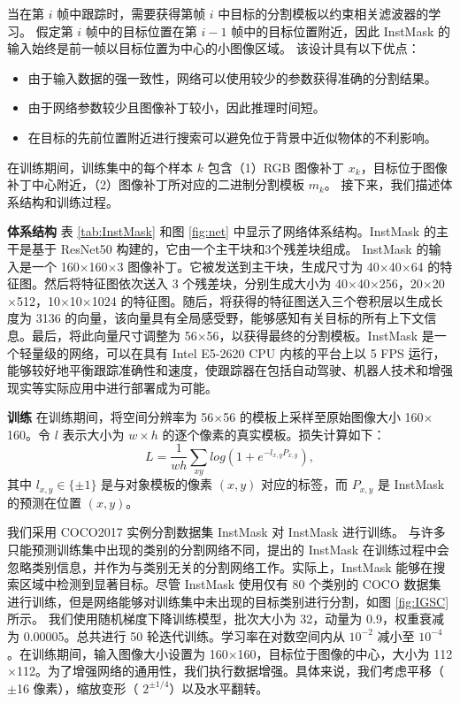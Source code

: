 当在第 $i$ 帧中跟踪时，需要获得第帧 $i$ 中目标的分割模板以约束相关滤波器的学习。
假定第 $i$ 帧中的目标位置在第 $i-1$ 帧中的目标位置附近，因此 InstMask 的输入始终是前一帧以目标位置为中心的小图像区域。
该设计具有以下优点：

\begin{itemize}
\item 由于输入数据的强一致性，网络可以使用较少的参数获得准确的分割结果。
\item 由于网络参数较少且图像补丁较小，因此推理时间短。
\item 在目标的先前位置附近进行搜索可以避免位于背景中近似物体的不利影响。
\end{itemize}

在训练期间，训练集中的每个样本 $k$ 包含（1）RGB 图像补丁 $x_k$，目标位于图像补丁中心附近，（2）图像补丁所对应的二进制分割模板 $m_{k}$。
接下来，我们描述体系结构和训练过程。

\textbf{体系结构} 表 \ref{tab:InstMask} 和图 \ref{fig:net} 中显示了网络体系结构。InstMask 的主干是基于 ResNet50 \cite{He2016DeepRL} 构建的，它由一个主干块和3个残差块组成。
InstMask 的输入是一个 160$\times$160$\times$3 图像补丁。它被发送到主干块，生成尺寸为 40$\times$40$\times$64 的特征图。然后将特征图依次送入 3 个残差块，分别生成大小为 40$\times$40$\times$256，20$\times$20$\times$512，10$\times$10$\times$1024 的特征图。随后，将获得的特征图送入三个卷积层以生成长度为 3136 的向量，该向量具有全局感受野，能够感知有关目标的所有上下文信息。最后，将此向量尺寸调整为 56$\times$56，以获得最终的分割模板。InstMask 是一个轻量级的网络，可以在具有 Intel E5-2620 CPU 内核的平台上以 5 FPS 运行，能够较好地平衡跟踪准确性和速度，使跟踪器在包括自动驾驶、机器人技术和增强现实等实际应用中进行部署成为可能。

\textbf{训练} 在训练期间，将空间分辨率为 56$\times$56 的模板上采样至原始图像大小 160$\times$160。令 $l$ 表示大小为 $w \times h$ 的逐个像素的真实模板。损失计算如下：
\begin{equation}
L = \frac{1}{wh} \sum_{xy}{log(1+e^{-l_{x,y}P_{x,y}})},
\end{equation}
其中 $l_{x,y} \in \{ \pm 1 \}$ 是与对象模板的像素 $(x,y)$ 对应的标签，而 $P_{x,y}$ 是 InstMask 的预测在位置 $(x,y)$。

我们采用 COCO2017 \cite{COCO} 实例分割数据集 InstMask 对 InstMask 进行训练。
与许多只能预测训练集中出现的类别的分割网络不同，提出的 InstMask 在训练过程中会忽略类别信息，并作为与类别无关的分割网络工作。实际上，InstMask 能够在搜索区域中检测到显著目标。尽管 InstMask 使用仅有 80 个类别的 COCO 数据集 \cite{COCO} 进行训练，但是网络能够对训练集中未出现的目标类别进行分割，如图 \ref{fig:IGSC} 所示。
我们使用随机梯度下降训练模型，批次大小为 32，动量为 0.9，权重衰减为 0.00005。总共进行 50 轮迭代训练。学习率在对数空间内从 $10^{-2}$ 减小至 $10^{-4}$。在训练期间，输入图像大小设置为 160$\times$160，目标位于图像的中心，大小为 112$\times$112。为了增强网络的通用性，我们执行数据增强。具体来说，我们考虑平移（$\pm$16 像素），缩放变形（ $2^{\pm 1/4}$）以及水平翻转。

